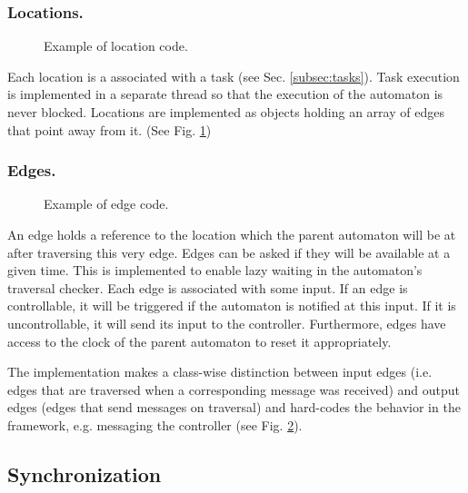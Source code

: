 \subsubsection{Locations.}

\begin{figure}[t]

\caption{Example of location code.}
\label{location-example}
\end{figure}

Each location is a associated with a task (see Sec. \ref{subsec:tasks}). Task
execution is implemented in a separate thread so that the execution of the
automaton is never blocked. Locations are implemented as objects holding an
array of edges that point away from it. (See Fig. \ref{location-example})


\subsubsection{Edges.}
\label{subsubsec:edges}

\begin{figure}[t]

\caption{Example of edge code.}
\label{edge-example}
\end{figure}

An edge holds a reference to the location which the parent automaton
will be at after traversing this very edge. Edges can be asked if
they will be available at a given time. This is implemented to enable
lazy waiting in the automaton's traversal checker. Each edge is associated
with some input. If an edge is controllable, it will be triggered
if the automaton is notified at this input. If it is uncontrollable,
it will send its input to the controller. Furthermore, edges have
access to the clock of the parent automaton to reset it appropriately.

The implementation makes a class-wise distinction between input edges
(i.e. edges that are traversed when a corresponding message was received) and
output edges (edges that send messages on traversal) and hard-codes the behavior
in the framework, e.g. messaging the controller (see Fig. \ref{edge-example}).


\subsection{Synchronization}
\label{subsec:synch}

